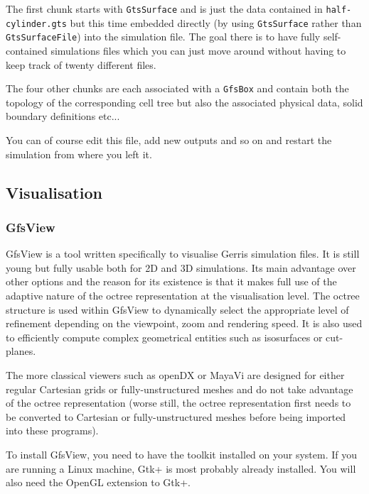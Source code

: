 \documentclass[a4paper]{article}
\begin{document}
The first chunk starts with {\tt GtsSurface} and is
just the data contained in {\tt half-cylinder.gts} but this time
embedded directly (by using {\tt GtsSurface} rather than {\tt
GtsSurfaceFile}) into the simulation file. The goal there is to have
fully self-contained simulations files which you can just move around
without having to keep track of twenty different files.

The four other chunks are each associated with a {\tt GfsBox} and
contain both the topology of the corresponding cell tree but also the
associated physical data, solid boundary definitions etc...

You can of course edit this file, add new outputs and so on and
restart the simulation from where you left it.

\subsection{Visualisation}

\subsubsection{GfsView}

GfsView is a tool written specifically to visualise Gerris simulation
files. It is still young but fully usable both for 2D and 3D
simulations. Its main advantage over other options and the reason for
its existence is that it makes full use of the adaptive nature of the
octree representation at the visualisation level. The octree structure
is used within GfsView to dynamically select the appropriate level of
refinement depending on the viewpoint, zoom and rendering speed. It is
also used to efficiently compute complex geometrical entities such as
isosurfaces or cut-planes.

The more classical viewers such as openDX or MayaVi are designed for
either regular Cartesian grids or fully-unstructured meshes and do not
take advantage of the octree representation (worse still, the octree
representation first needs to be converted to Cartesian or
fully-unstructured meshes before being imported into these programs).

To install GfsView, you need to have the
 toolkit installed on
your system. If you are running a Linux machine, Gtk+ is most probably
already installed. You will also need the
OpenGL extension to Gtk+.
\end{document}
